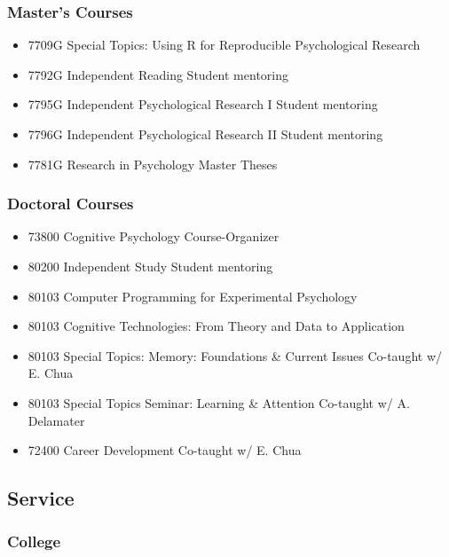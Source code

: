 \documentclass[11pt,a4paper,]{moderncv}
\providecommand{\tightlist}{%
	\setlength{\itemsep}{0pt}\setlength{\parskip}{0pt}}
\begin{document}
\hypertarget{masters-courses}{%
\subsubsection{Master's Courses}\label{masters-courses}}

\begin{itemize}
\tightlist
\item
  7709G Special Topics: Using R for Reproducible Psychological Research
\item
  7792G Independent Reading Student mentoring
\item
  7795G Independent Psychological Research I Student mentoring
\item
  7796G Independent Psychological Research II Student mentoring
\item
  7781G Research in Psychology Master Theses
\end{itemize}

\hypertarget{doctoral-courses}{%
\subsubsection{Doctoral Courses}\label{doctoral-courses}}

\begin{itemize}
\tightlist
\item
  73800 Cognitive Psychology Course-Organizer
\item
  80200 Independent Study Student mentoring
\item
  80103 Computer Programming for Experimental Psychology\\
\item
  80103 Cognitive Technologies: From Theory and Data to Application
\item
  80103 Special Topics: Memory: Foundations \& Current Issues Co-taught w/ E. Chua
\item
  80103 Special Topics Seminar: Learning \& Attention Co-taught w/ A. Delamater
\item
  72400 Career Development Co-taught w/ E. Chua
\end{itemize}

\hypertarget{service}{%
\subsection{Service}\label{service}}

\hypertarget{college}{%
\subsubsection{College}\label{college}}
\end{document}
